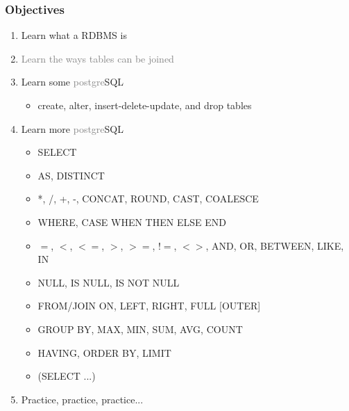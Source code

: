 \documentclass[xcolor={dvipsnames}]{beamer}
\begin{document}
\frame
{
\frametitle{Objectives}

\Large
\begin{enumerate}%
\item Learn what a RDBMS is

\item \textcolor{gray}{Learn the ways tables can be joined}


\item Learn some \textcolor{gray}{postgre}SQL

\begin{itemize}
\item create, alter, insert-delete-update, and drop tables
\end{itemize}

\item Learn more \textcolor{gray}{postgre}SQL
\begin{itemize}
\color{gray}
\item SELECT
\item AS, DISTINCT
\item *, /, +, -, CONCAT, ROUND, CAST, COALESCE
\item WHERE, CASE WHEN THEN ELSE END
\item  $=$, $<$, $<=$, $>$, $>=$, $!=$, $<>$, AND, OR, BETWEEN, LIKE, IN 
\item NULL, IS NULL, IS NOT NULL
\item FROM/JOIN ON,  LEFT, RIGHT, FULL [OUTER]
\item GROUP BY, MAX, MIN, SUM, AVG, COUNT
\item HAVING, ORDER BY, LIMIT
\item (SELECT ...)
\end{itemize}

\item Practice, practice, practice...
\end{enumerate}
}
\end{document}
